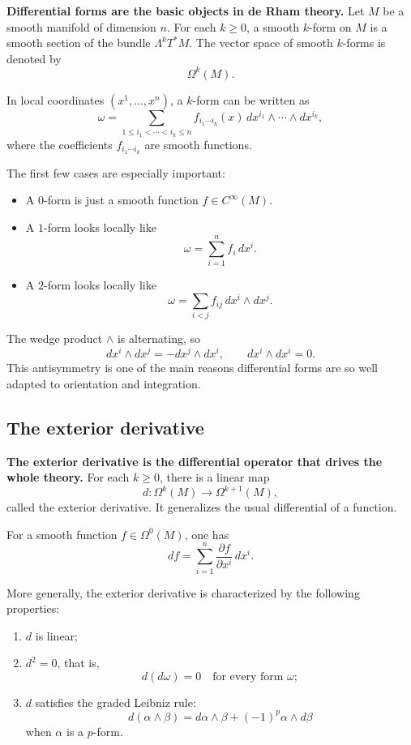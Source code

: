 \documentclass[12pt,a4paper]{article}
\theoremstyle{notespace}
\begin{document}
\textbf{Differential forms are the basic objects in de Rham theory.} Let \(M\) be a smooth manifold of dimension \(n\). For each \(k\ge 0\), a smooth \(k\)-form on \(M\) is a smooth section of the bundle \(\Lambda^k T^*M\). The vector space of smooth \(k\)-forms is denoted by
\[
\Omega^k(M).
\]

In local coordinates \((x^1,\dots,x^n)\), a \(k\)-form can be written as
\[
\omega=\sum_{1\le i_1<\cdots<i_k\le n} f_{i_1\cdots i_k}(x)\, dx^{i_1}\wedge \cdots \wedge dx^{i_k},
\]
where the coefficients \(f_{i_1\cdots i_k}\) are smooth functions.

The first few cases are especially important:

\begin{itemize}
	\item A \(0\)-form is just a smooth function \(f\in C^\infty(M)\).
	\item A \(1\)-form looks locally like
	\[
	\omega=\sum_{i=1}^n f_i\,dx^i.
	\]
	\item A \(2\)-form looks locally like
	\[
	\omega=\sum_{i<j} f_{ij}\,dx^i\wedge dx^j.
	\]
\end{itemize}

The wedge product \(\wedge\) is alternating, so
\[
dx^i\wedge dx^j=-dx^j\wedge dx^i,
\qquad
dx^i\wedge dx^i=0.
\]
This antisymmetry is one of the main reasons differential forms are so well adapted to orientation and integration.

\subsection{The exterior derivative}

\textbf{The exterior derivative is the differential operator that drives the whole theory.} For each \(k\ge 0\), there is a linear map
\[
d:\Omega^k(M)\to \Omega^{k+1}(M),
\]
called the exterior derivative. It generalizes the usual differential of a function.

For a smooth function \(f\in \Omega^0(M)\), one has
\[
df=\sum_{i=1}^n \frac{\partial f}{\partial x^i}\,dx^i.
\]

More generally, the exterior derivative is characterized by the following properties:

\begin{enumerate}
	\item \(d\) is linear;
	\item \(d^2=0\), that is,
	\[
	d(d\omega)=0
	\quad\text{for every form }\omega;
	\]
	\item \(d\) satisfies the graded Leibniz rule:
	\[
	d(\alpha\wedge\beta)=d\alpha\wedge\beta+(-1)^p\alpha\wedge d\beta
	\]
	when \(\alpha\) is a \(p\)-form.
\end{enumerate}
\end{document}
